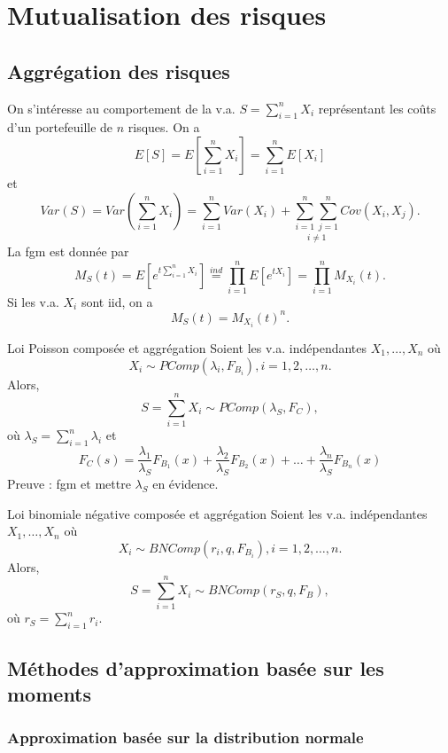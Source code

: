 \chapter{Mutualisation des risques}

\section{Aggrégation des risques}

On s'intéresse au comportement de la v.a. $S = \sum_{i = 1}^{n}X_i$ représentant les coûts  d'un portefeuille de $n$ risques. On a 
$$E[S] = E\left[\sum_{i = 1}^{n} X_i\right] = \sum_{i = 1}^{n}E[X_i]$$
et
$$Var(S) = Var\left(\sum_{i = 1}^{n}X_i\right) = \sum_{i = 1}^{n} Var(X_i) + \underset{i \neq 1}{\sum_{i = 1}^{n}\sum_{j = 1}^{n}}Cov(X_i, X_j).$$
La fgm est donnée par 
$$M_S(t) = E\left[e^{t\sum_{i = 1}^{n}X_i}\right] \stackrel{ind}{=} \prod_{i = 1}^{n} E\left[e^{tX_i}\right] = \prod_{i = 1}^{n}M_{X_i}(t).$$
Si les v.a. $X_i$ sont iid, on a 
$$M_S(t) = M_{X_i}(t)^n.$$ 

\begin{proposition}{Loi Poisson composée et aggrégation}{}
	Soient les v.a. indépendantes $X_1, \dots, X_n$ où
	$$X_i \sim PComp(\lambda_i, F_{B_i}), i = 1, 2, \dots, n.$$
	Alors, 
	$$S = \sum_{i = 1}^{n} X_i \sim PComp(\lambda_S, F_{C}),$$
	où $\lambda_S = \sum_{i = 1}^{n}\lambda_i$ et 
	$$F_{C}(s) = \frac{\lambda_1}{\lambda_S}F_{B_1}(x) + \frac{\lambda_2}{\lambda_S}F_{B_2}(x) + \dots + \frac{\lambda_n}{\lambda_S}F_{B_n}(x)$$
	\tcblower
	Preuve : fgm et mettre $\lambda_S$ en évidence. 
\end{proposition}

\begin{proposition}{Loi binomiale négative composée et aggrégation}{}
	Soient les v.a. indépendantes $X_1, \dots, X_n$ où
	$$X_i \sim BNComp(r_i, q, F_{B_i}), i = 1, 2, \dots, n.$$
	Alors, 
	$$S = \sum_{i = 1}^{n} X_i \sim BNComp(r_S, q, F_{B}),$$
	où $r_S = \sum_{i = 1}^{n}r_i$.
\end{proposition}

\section{Méthodes d'approximation basée sur les moments}

\subsection{Approximation basée sur la distribution normale}


